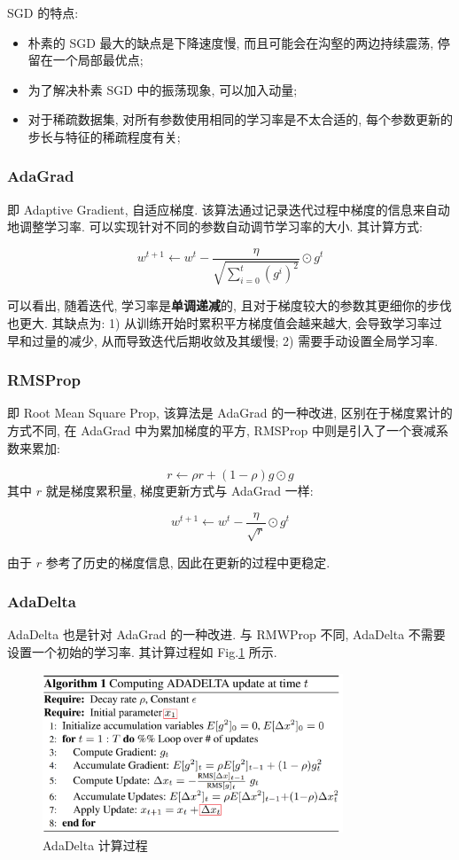 SGD 的特点: 
\begin{itemize}
	\item 朴素的 SGD 最大的缺点是下降速度慢, 而且可能会在沟壑的两边持续震荡, 停留在一个局部最优点;
	
	\item 为了解决朴素 SGD 中的振荡现象, 可以加入动量;
	
	\item 对于稀疏数据集, 对所有参数使用相同的学习率是不太合适的, 每个参数更新的步长与特征的稀疏程度有关;
\end{itemize}

\subsubsection{AdaGrad}
即 Adaptive Gradient, 自适应梯度. 该算法通过记录迭代过程中梯度的信息来自动地调整学习率. 可以实现针对不同的参数自动调节学习率的大小. 其计算方式:

$$
w^{t+1} \leftarrow w^t - \frac{\eta}{\sqrt{\sum_{i=0}^t (g^i)^2}} \odot g^t
$$

可以看出, 随着迭代, 学习率是\textbf{单调递减}的, 且对于梯度较大的参数其更细你的步伐也更大. 其缺点为: 1) 从训练开始时累积平方梯度值会越来越大, 会导致学习率过早和过量的减少, 从而导致迭代后期收敛及其缓慢; 2) 需要手动设置全局学习率. 

\subsubsection{RMSProp}
即 Root Mean Square Prop, 该算法是 AdaGrad 的一种改进, 区别在于梯度累计的方式不同, 在 AdaGrad 中为累加梯度的平方, RMSProp 中则是引入了一个衰减系数来累加:

$$
r \leftarrow \rho r + (1 - \rho) g \odot g
$$
其中 $r$ 就是梯度累积量, 梯度更新方式与 AdaGrad 一样:

$$
w^{t+1} \leftarrow w^t - \frac{\eta}{\sqrt{r}} \odot g^t
$$

由于 $r$ 参考了历史的梯度信息, 因此在更新的过程中更稳定.

\subsubsection{AdaDelta}
AdaDelta 也是针对 AdaGrad 的一种改进. 与 RMWProp 不同, AdaDelta 不需要设置一个初始的学习率. 其计算过程如 Fig.\ref{fig:adadelta} 所示.

\begin{figure}[h]
	\centering
	\includegraphics[width=0.8\textwidth]{pics/adadelta.png}
	\caption{AdaDelta 计算过程}
	\label{fig:adadelta}
\end{figure}

